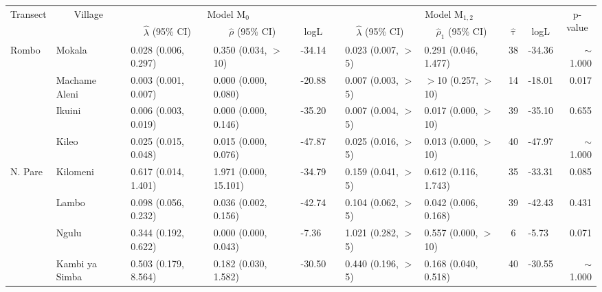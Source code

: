 \begin{tabular}{llllllllclr} 
\toprule
\multicolumn{1}{c}{\multirow{2}{*}{Transect}} & \multicolumn{1}{c}{\multirow{2}{*}{Village}} & \multicolumn{3}{c}{Model M$_{0}$} & \multicolumn{1}{c}{} & \multicolumn{4}{c}{Model M$_{1,2}$} & \multicolumn{1}{c}{\multirow{2}{*}{p-value}}  \\ 
\cmidrule{3-5}\cmidrule{7-10}
\multicolumn{1}{c}{} & \multicolumn{1}{c}{} & \multicolumn{1}{c}{$\hat{\lambda}$ (95\% CI)} & \multicolumn{1}{c}{$\hat{\rho}$ (95\% CI)} & \multicolumn{1}{c}{logL} & \multicolumn{1}{c}{} & \multicolumn{1}{c}{$\hat{\lambda}$ (95\% CI)} & \multicolumn{1}{c}{$\hat{\rho}_1$ (95\% CI)} &  \multicolumn{1}{c}{$\hat{\uptau}$} & \multicolumn{1}{c}{logL} & \multicolumn{1}{c}{} \\ 
\midrule
Rombo       & Mokala         & 0.028 (0.006, 0.297)   & 0.350 (0.034, $>$10)   & -34.14   & & 0.023 (0.007, $>$5)    & 0.291 (0.046, 1.477)   & 38   & -34.36   & $\sim$1.000\\
            & Machame Aleni  & 0.003 (0.001, 0.007)   & 0.000 (0.000, 0.080)   & -20.88   & & 0.007 (0.003, $>$5)    & $>$10 (0.257, $>$10)   & 14   & -18.01   & 0.017\\
            & Ikuini         & 0.006 (0.003, 0.019)   & 0.000 (0.000, 0.146)   & -35.20   & & 0.007 (0.004, $>$5)    & 0.017 (0.000, $>$10)   & 39   & -35.10   & 0.655\\
            & Kileo          & 0.025 (0.015, 0.048)   & 0.015 (0.000, 0.076)   & -47.87   & & 0.025 (0.016, $>$5)    & 0.013 (0.000, $>$10)   & 40   & -47.97   & $\sim$1.000\\
\cmidrule{2-11}
N. Pare     & Kilomeni       & 0.617 (0.014, 1.401)   & 1.971 (0.000, 15.101)  & -34.79   & & 0.159 (0.041, $>$5)    & 0.612 (0.116, 1.743)   & 35   & -33.31   & 0.085\\
            & Lambo          & 0.098 (0.056, 0.232)   & 0.036 (0.002, 0.156)   & -42.74   & & 0.104 (0.062, $>$5)    & 0.042 (0.006, 0.168)   & 39   & -42.43   & 0.431\\
            & Ngulu          & 0.344 (0.192, 0.622)   & 0.000 (0.000, 0.043)   & -7.36    & & 1.021 (0.282, $>$5)    & 0.557 (0.000, $>$10)   & 6    & -5.73    & 0.071\\
            & Kambi ya Simba & 0.503 (0.179, 8.564)   & 0.182 (0.030, 1.582)   & -30.50   & & 0.440 (0.196, $>$5)    & 0.168 (0.040, 0.518)   & 40   & -30.55   & $\sim$1.000\\

\end{tabular}
